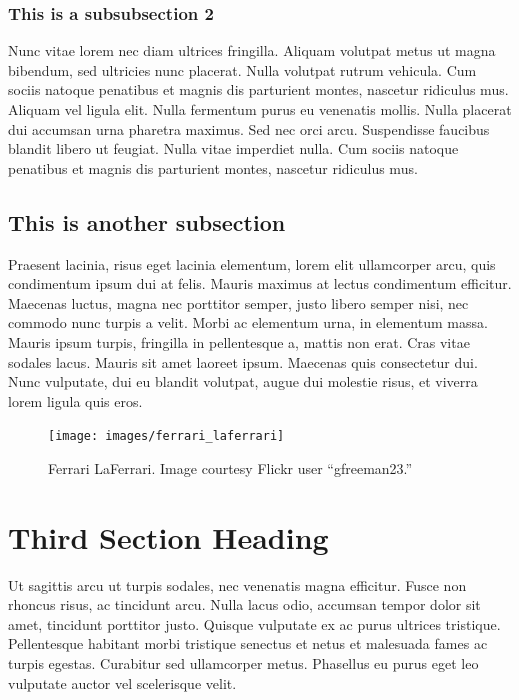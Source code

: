 \documentclass{acmsiggraph}
\begin{document}
\subsubsection{This is a subsubsection 2}
Nunc vitae lorem nec diam ultrices fringilla. Aliquam volutpat metus ut magna bibendum, sed ultricies nunc placerat. Nulla volutpat rutrum vehicula. Cum sociis natoque penatibus et magnis dis parturient montes, nascetur ridiculus mus. Aliquam vel ligula elit. Nulla fermentum purus eu venenatis mollis. Nulla placerat dui accumsan urna pharetra maximus. Sed nec orci arcu. Suspendisse faucibus blandit libero ut feugiat. Nulla vitae imperdiet nulla. Cum sociis natoque penatibus et magnis dis parturient montes, nascetur ridiculus mus.
\subsection{This is another subsection}

Praesent lacinia, risus eget lacinia elementum, lorem elit ullamcorper arcu, quis condimentum ipsum dui at felis. Mauris maximus at lectus condimentum efficitur. Maecenas luctus, magna nec porttitor semper, justo libero semper nisi, nec commodo nunc turpis a velit. Morbi ac elementum urna, in elementum massa. Mauris ipsum turpis, fringilla in pellentesque a, mattis non erat. Cras vitae sodales lacus. Mauris sit amet laoreet ipsum. Maecenas quis consectetur dui. Nunc vulputate, dui eu blandit volutpat, augue dui molestie risus, et viverra lorem ligula quis eros.

\begin{figure}[ht]
  \centering
  \texttt{[image: images/ferrari\_laferrari]}
  \caption{Ferrari LaFerrari. Image courtesy Flickr user ``gfreeman23.''}
  \label{fig:ferrari}
\end{figure}

\section{Third Section Heading}

Ut sagittis arcu ut turpis sodales, nec venenatis magna efficitur. Fusce non rhoncus risus, ac tincidunt arcu. Nulla lacus odio, accumsan tempor dolor sit amet, tincidunt porttitor justo. Quisque vulputate ex ac purus ultrices tristique. Pellentesque habitant morbi tristique senectus et netus et malesuada fames ac turpis egestas. Curabitur sed ullamcorper metus. Phasellus eu purus eget leo vulputate auctor vel scelerisque velit.
\end{document}
